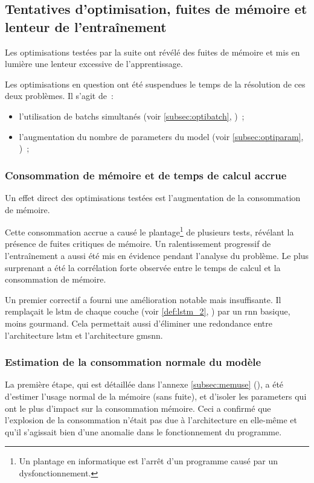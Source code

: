 \subsection{Tentatives d'optimisation, fuites de mémoire et lenteur de l'entraînement}\label{subsec:optimem}

Les optimisations testées par la suite ont révélé des fuites de mémoire et mis en lumière une lenteur excessive de l'apprentissage.

Les optimisations en question ont été suspendues le temps de la résolution de ces deux problèmes.
Il s'agit de~:
\begin{itemize}
	\item l'utilisation de \glspl{batch} simultanés (voir \autoref{subsec:optibatch}, )~; 
	\item l'augmentation du nombre de \glspl{parameter} du \gls{model} (voir \autoref{subsec:optiparam}, )~;
\end{itemize}

\subsubsection{Consommation de mémoire et de temps de calcul accrue}
Un effet direct des optimisations testées est l'augmentation de la consommation de mémoire.

Cette consommation accrue a causé le plantage\footnote{Un plantage en informatique est l'arrêt d'un programme causé par un dysfonctionnement.} de plusieurs tests, révélant la présence de fuites critiques de mémoire.
Un ralentissement progressif de l'entraînement a aussi été mis en évidence pendant l'analyse du problème.
Le plus surprenant a été la corrélation forte observée entre le temps de calcul et la consommation de mémoire.

Un premier correctif a fourni une amélioration notable mais insuffisante.
Il remplaçait le \gls{lstm} de chaque couche (voir \autoref{def:lstm_2}, ) par un \gls{rnn} basique, moins gourmand. Cela permettait aussi d'éliminer une redondance entre l'architecture \gls{lstm} et l'architecture \gls{gmsnn}.

\subsubsection{Estimation de la consommation normale du modèle}
La première étape, qui est détaillée dans l'annexe \ref{subsec:memuse} (), a été d'estimer l'usage normal de la mémoire (sans fuite), et d'isoler les \glspl{parameter} qui ont le plus d'impact sur la consommation mémoire.
Ceci a confirmé que l'explosion de la consommation n'était pas due à l'architecture en elle-même et qu'il s'agissait bien d'une anomalie dans le fonctionnement du programme.


